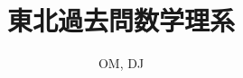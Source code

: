 \documentclass[a4,12pt]{jsarticle}
\theoremstyle{definition}
\numberwithin{equation}{section}
\begin{document}
\title{東北過去問数学理系}
\author{OM, DJ}
\date{}
\maketitle
\newpage



\end{document}
